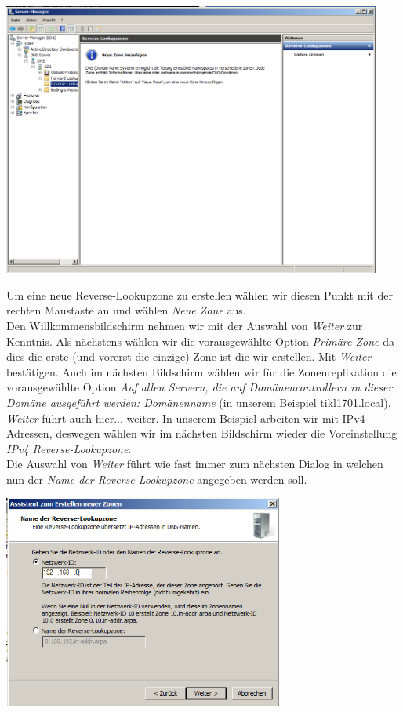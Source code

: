 \documentclass[12pt,a4paper,titlepage]{scrartcl} %
\begin{document}
	\begin{center}\includegraphics[height=9cm]{Bilder/029(DNS01)}\\ \end{center}

Um eine neue Reverse-Lookupzone zu erstellen wählen wir diesen Punkt mit der rechten Maustaste an und wählen \emph{Neue Zone} aus.\\
Den Willkommensbildschirm nehmen wir mit der Auswahl von \emph{Weiter} zur Kenntnis. Als nächstens wählen wir die vorausgewählte Option \emph{Primäre Zone} da dies die erste (und vorerst die einzige) Zone ist die wir erstellen. Mit \emph{Weiter} bestätigen. Auch im nächsten Bildschirm wählen wir für die Zonenreplikation die vorausgewählte Option \emph{Auf allen Servern, die auf Domänencontrollern in dieser Domäne ausgeführt werden: \textit{Domänenname}} (in unserem Beispiel tikl1701.local). \emph{Weiter} führt auch hier... weiter. In unserem Beispiel arbeiten wir mit IPv4 Adressen, deswegen wählen wir im nächsten Bildschirm wieder die Voreinstellung \emph{IPv4 Reverse-Lookupzone}.\\
Die Auswahl von \emph{Weiter} führt wie fast immer zum nächsten Dialog in welchen nun der \emph{Name der Reverse-Lookupzone} angegeben werden soll.\\

	\begin{center}\includegraphics[height=7cm]{Bilder/034(DNS06)}\\ \end{center}
	
\end{document}
